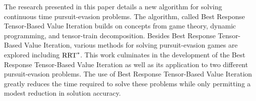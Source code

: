 % 
% 
%
The research presented in this paper details a new algorithm for solving continuous time pursuit-evasion problems.
The algorithm, called Best Response Tensor-Based Value Iteration builds on concepts from game theory, dynamic programming, and tensor-train decomposition.
Besides Best Response Tensor-Based Value Iteration, various methods for solving pursuit-evasion games are explored including $\textnormal{RRT}^*$.
This work culminates in the development of the Best Response Tensor-Based Value Iteration as well as its application to two different pursuit-evasion problems. The use of Best Response Tensor-Based Value Iteration greatly reduces the time required to solve these problems while only permitting a modest reduction in solution accuracy. 

